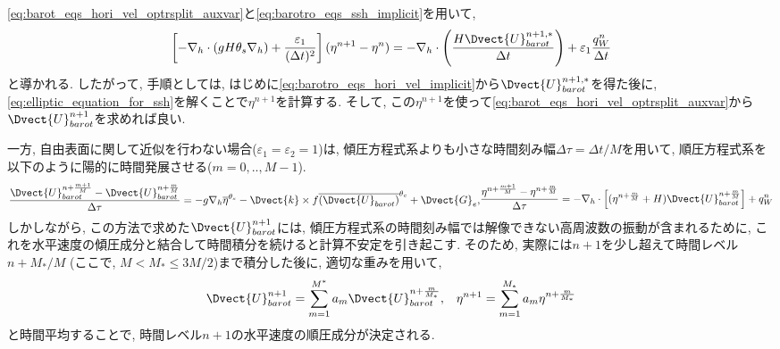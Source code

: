 \eqref{eq:barot_eqs_hori_vel_optrsplit_auxvar}と\eqref{eq:barotro_eqs_ssh_implicit}を用いて,
\begin{align}
 \left[ 
 - \nabla_h \cdot (g H \theta_s \nabla_h  )
 + \dfrac{\varepsilon_1}{(\Delta t)^2} \right] 
    (\eta^{n+1} - \eta^n)
 = - \nabla_h \cdot \left(\dfrac{H \Dvect{U}^{n+1,*}_{barot}}{\Delta t}\right) 
   + \varepsilon_1 \dfrac{q_W^n}{\Delta t}
\label{eq:elliptic_equation_for_ssh}
\end{align}
と導かれる. 
したがって, 手順としては, 
はじめに\eqref{eq:barotro_eqs_hori_vel_implicit}から$\Dvect{U}^{n+1,*}_{barot}$を得た後に,
\eqref{eq:elliptic_equation_for_ssh}を解くことで$\eta^{n+1}$を計算する. 
そして, この$\eta^{n+1}$を使って\eqref{eq:barot_eqs_hori_vel_optrsplit_auxvar}から
$\Dvect{U}_{barot}^{n+1}$を求めれば良い. 

一方, 自由表面に関して近似を行わない場合($\varepsilon_1=\varepsilon_2=1$)は, 
傾圧方程式系よりも小さな時間刻み幅$\Delta \tau=\Delta t/M$を用いて, 
順圧方程式系を以下のように陽的に時間発展させる($m=0,..,M-1$). 
\begin{subequations}
\begin{align}
  \dfrac{\Dvect{U}^{n+\frac{m+1}{M}}_{barot} 
         - \Dvect{U}^{n+\frac{m}{M}}_{barot}}
        {\Delta \tau} = 
 - g \nabla_h \overline{\eta}^{\theta_s}
 - \Dvect{k}\times f \overline{(\Dvect{U}_{barot})}^{\theta_c} 
 + \Dvect{G}_e, 
\end{align}
\begin{align}
\dfrac{\eta^{n+\frac{m+1}{M}} - \eta^{n+\frac{m}{M}}}{\Delta \tau}
 = - \nabla_h \cdot \left[ 
 	    (\eta^{n+\frac{m}{M}} + H)\Dvect{U}^{n+\frac{m}{M}}_{barot}
     \right] 
   + q_W^n
\end{align}
\end{subequations}
しかしながら, この方法で求めた$\Dvect{U}_{barot}^{n+1}$には, 
傾圧方程式系の時間刻み幅では解像できない高周波数の振動が含まれるために, 
これを水平速度の傾圧成分と結合して時間積分を続けると計算不安定を引き起こす.  
そのため, 実際には$n+1$を少し超えて時間レベル$n+M_*/M$ 
(ここで, $M < M_* \le 3M/2$)まで積分した後に, 適切な重みを用いて,  
\begin{equation*}
 \Dvect{U}_{barot}^{n+1} 
 = \sum_{m=1}^{M^*} a_m
 \Dvect{U}_{barot}^{n+\frac{m}{M_*}}, \;\;\;
  \eta^{n+1} = \sum_{m=1}^{M_*} a_m \eta^{n+\frac{m}{M_*}}
\end{equation*}
と時間平均することで, 時間レベル$n+1$の水平速度の順圧成分が決定される.

